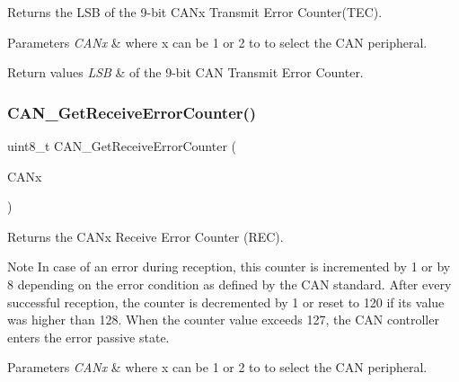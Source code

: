 Returns the L\+SB of the 9-\/bit C\+A\+Nx Transmit Error Counter(\+T\+E\+C). 


\begin{DoxyParams}{Parameters}
{\em C\+A\+Nx} & where x can be 1 or 2 to to select the C\+AN peripheral.\\
\hline
\end{DoxyParams}

\begin{DoxyRetVals}{Return values}
{\em L\+SB} & of the 9-\/bit C\+AN Transmit Error Counter. \\
\hline
\end{DoxyRetVals}
\mbox{\label{group___c_a_n___private___functions_ga6903eecbec40eb1361d915ddde9a3274}} 
\subsubsection{\texorpdfstring{CAN\_GetReceiveErrorCounter()}{CAN\_GetReceiveErrorCounter()}}
{\footnotesize\ttfamily uint8\+\_\+t C\+A\+N\+\_\+\+Get\+Receive\+Error\+Counter (\begin{DoxyParamCaption}\item[{\mbox{\hyperlink{struct_c_a_n___type_def}{C\+A\+N\+\_\+\+Type\+Def}} $\ast$}]{C\+A\+Nx }\end{DoxyParamCaption})}



Returns the C\+A\+Nx Receive Error Counter (R\+EC). 

\begin{DoxyNote}{Note}
In case of an error during reception, this counter is incremented by 1 or by 8 depending on the error condition as defined by the C\+AN standard. After every successful reception, the counter is decremented by 1 or reset to 120 if its value was higher than 128. When the counter value exceeds 127, the C\+AN controller enters the error passive state.
\end{DoxyNote}

\begin{DoxyParams}{Parameters}
{\em C\+A\+Nx} & where x can be 1 or 2 to to select the C\+AN peripheral.\\
\hline
\end{DoxyParams}


